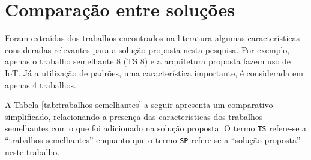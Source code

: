 \section{Comparação entre soluções} \label{sec:comparacao}

Foram extraídas dos trabalhos encontrados na literatura algumas características
consideradas relevantes para a solução proposta nesta pesquisa. Por exemplo,
apenas o trabalho semelhante 8 (TS 8) e a arquitetura proposta fazem uso de
IoT. Já a utilização de padrões, uma característica importante, é considerada
em apenas 4 trabalhos.

A Tabela \ref{tab:trabalhos-semelhantes} a seguir apresenta um comparativo
simplificado, relacionando a presença das características dos trabalhos
semelhantes com o que foi adicionado na solução proposta. O termo \texttt{TS}
refere-se a ``trabalhos semelhantes'' enquanto que o termo \texttt{SP}
refere-se a ``solução proposta'' neste trabalho.


